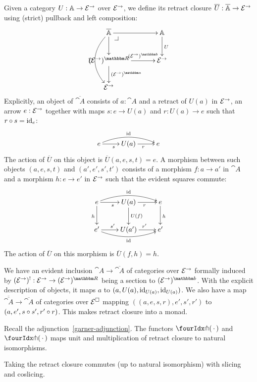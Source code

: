 \documentclass[reqno,10pt,a4paper,oneside]{amsart}
\begin{document}
Given a category $U : \mathbb{A} \to \mathcal{E}^{\to}$ over $\mathcal{E}^{\to}$, we define its retract closure $\overline{U} : \overline{\mathbb{A}} \to \mathcal{E}^{\to}$ using (strict) pullback and left composition:
\[
\xymatrix@C+1em{
  \overline{\cat{A}}
  \ar[r]
  \ar[d]
  \ar@/_2em/[dd]_{\overline{U}}
  \pullback{dr}
&
  \cat{A}
  \ar[d]^{U}
\\
  (\catE^{\to})^{\ret}
  \ar[r]^-{(\catE^{\to})^{\retB}}
  \ar[d]^{(\catE^{\to})^{\retA}}
&
  \catE^{\to}
\\
  \catE^{\to}
}
\]
Explicitly, an object of $\overline{\cat{A}}$ consists of $a : \cat{A}$ and a retract of $U(a)$ in $\mathcal{E}^{\to}$, \ie an arrow $e : \mathcal{E}^{\to}$ together with maps $s : e \to U(a)$ and $r : U(a) \to e$ such that $r \mathbin{\circ} s = \operatorname{id}_e$:
\[
\xymatrix{
  e
  \ar[r]_{s}
  \ar@/^1em/[rr]^{\id}
&
  U(a)
  \ar[r]_{r}
&
  e
}
\]
The action of $\overline{U}$ on this object is $\overline{U}(a, e, s, t) = e$.
A morphism between such objects $(a, e, s, t)$ and $(a', e', s', t')$ consists of a morphism $f : a \to a'$ in $\cat{A}$ and a morphism $h : e \to e'$ in $\mathcal{E}^{\to}$ such that the evident squares commute:
\[
\xymatrix{
  e
  \ar[r]_{s}
  \ar@/^1em/[rr]^{\id}
  \ar[d]_{h}
&
  U(a)
  \ar[r]_{r}
  \ar[d]^{U(f)}
&
  e
  \ar[d]^{h}
\\
  e'
  \ar[r]^{s'}
  \ar@/_1em/[rr]_{\id}
&
  U(a')
  \ar[r]^{r'}
&
  e'
}
\]
The action of $\overline{U}$ on this morphism is $\overline{U}(f, h) = h$.

We have an evident inclusion $\cat{A} \to \overline{\cat{A}}$ of categories over $\mathcal{E}^{\to}$ formally induced by $(\catE^{\to})^{\canonical} : \catE^{\to} \to (\catE^{\to})^{\ret}$ being a section to $(\catE^{\to})^{\retB}$.
With the explicit description of objects, it maps $a$ to $(a, U(a), \operatorname{id}_{U(a)}, \operatorname{id}_{U(a)})$.
We also have a map $\overline{\overline{\cat{A}}} \to \overline{\cat{A}}$ of categories over $\mathcal{E}^{\Box}$ mapping $((a, e, s, r), e', s', r')$ to $(a, e', s \mathbin{\circ} s', r' \mathbin{\circ} r)$.
This makes retract closure into a monad.

\begin{lemma}
\label{retract-closure}
Recall the adjunction~\eqref{garner-adjunction}.
The functors $\liftr{\brarghole}$ and $\liftl{\brarghole}$ maps unit and multiplication of retract closure to natural isomorphisms.
\end{lemma}

\begin{remark}
\label{retract-closure-slicing}
Taking the retract closure commutes (up to natural isomorphism) with slicing and coslicing.
\end{remark}
\end{document}

